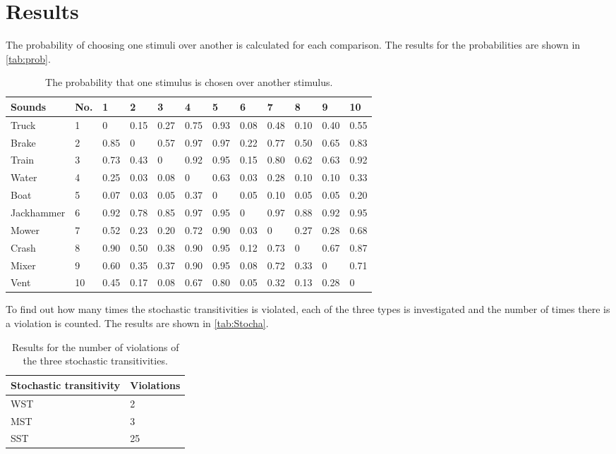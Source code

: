 \section*{Results}
\label{results}
%
The probability of choosing one stimuli over another is calculated for each comparison. The results for the probabilities are shown in \autoref{tab:prob}. 
%
\begin{table}[H]
\centering
\begin{tabular}{@{}llllllllllll@{}}
\toprule
Sounds     & No. & 1    & 2    & 3    & 4    & 5    & 6    & 7    & 8    & 9    & 10 \\ \midrule
Truck      & 1   & 0    & 0.15 & 0.27 & 0.75 & 0.93 & 0.08 & 0.48 & 0.10 & 0.40 & 0.55 \\
Brake      & 2   & 0.85 & 0    & 0.57 & 0.97 & 0.97 & 0.22 & 0.77 & 0.50 & 0.65 & 0.83 \\
Train      & 3   & 0.73 & 0.43 & 0    & 0.92 & 0.95 & 0.15 & 0.80 & 0.62 & 0.63 & 0.92 \\
Water      & 4   & 0.25 & 0.03 & 0.08 & 0    & 0.63 & 0.03 & 0.28 & 0.10 & 0.10 & 0.33 \\
Boat       & 5   & 0.07 & 0.03 & 0.05 & 0.37 & 0    & 0.05 & 0.10 & 0.05 & 0.05 & 0.20 \\
Jackhammer & 6   & 0.92 & 0.78 & 0.85 & 0.97 & 0.95 & 0    & 0.97 & 0.88 & 0.92 & 0.95 \\
Mower      & 7   & 0.52 & 0.23 & 0.20 & 0.72 & 0.90 & 0.03 & 0    & 0.27 & 0.28 & 0.68 \\
Crash      & 8   & 0.90 & 0.50 & 0.38 & 0.90 & 0.95 & 0.12 & 0.73 & 0    & 0.67 & 0.87 \\
Mixer      & 9   & 0.60 & 0.35 & 0.37 & 0.90 & 0.95 & 0.08 & 0.72 & 0.33 & 0    & 0.71 \\
Vent       & 10  & 0.45 & 0.17 & 0.08 & 0.67 & 0.80 & 0.05 & 0.32 & 0.13 & 0.28 & 0  \\ \bottomrule
\end{tabular}
\caption{The probability that one stimulus is chosen over another stimulus.}
\label{tab:prob}
\end{table} 
\noindent 
%
To find out how many times the stochastic transitivities is violated, each of the three types is investigated and the number of times there is a violation is counted. The results are shown in \autoref{tab:Stocha}. 
%
\begin{table}[H]
\centering
\begin{tabular}{@{}ll@{}}
\toprule
Stochastic transitivity     & Violations \\ \midrule
WST      & 2   \\
MST      & 3   \\
SST      & 25   \\ \bottomrule
\end{tabular}
\caption{Results for the number of violations of the three stochastic transitivities.}
\label{tab:Stocha}
\end{table} 

